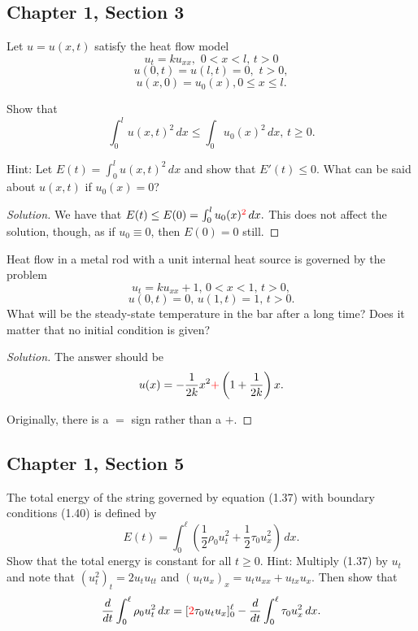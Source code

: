 \documentclass[11pt]{article}
\newenvironment{solution}
  {\renewcommand\qedsymbol{$\blacksquare$}\begin{proof}[Solution]}
  {\end{proof}}
\begin{document}
\subsection{Chapter 1, Section 3}
\begin{exercise}{2}
  Let $u = u(x, t)$ satisfy the heat flow model 
  \[ u_t =ku_{xx}, \, \, 0<x<l, \, t>0 \]
  \[ u(0,t) = u(l,t) = 0, \, \, t > 0,\]
  \[ u(x,0)=u_0(x), 0 \leq x \leq l.\] 
  
  Show that
  \[ \int_0^l u(x, t)^2 \, dx \leq \int_0 u_0(x)^2 \, dx, \, t \geq 0. \]
  
  Hint: Let $E(t) = \int_0^l u(x, t)^2 \, dx$ and show that $E'(t) \leq 0$. What can be said about $u(x, t)$ if $u_0(x) = 0$?
\end{exercise}

\begin{solution}
We have that $E(t) \leq E(0) = \int_0^l u_0(x)^{\textcolor{red}{2}} \, dx.$ This does not affect the solution, though, as if $u_0 \equiv 0$, then $E(0) = 0$ still.

\end{solution}

\begin{exercise}{6}
Heat flow in a metal rod with a unit internal heat source is governed by the problem
\[u_t=ku_{xx}+1, \, 0<x<1, \, t>0, \]
\[u(0,t)=0, \, u(1,t)=1, \, t>0. \]
What will be the steady-state temperature in the bar after a long time? Does it matter that no initial condition is given?
\end{exercise}

\begin{solution}
  The answer should be \[u(x) = -\frac{1}{2k}x^2 \textcolor{red}{+} \left(1+\frac{1}{2k}\right) x.\]

  Originally, there is a $=$ sign rather than a $+$.
\end{solution}

\setcounter{subsection}{4}
\subsection{Chapter 1, Section 5}

\begin{exercise}{5}The total energy of the string governed by equation (1.37) with boundary conditions (1.40) is defined by \[E(t) = \int_{0}^{\ell} \left( \frac{1}{2} \rho_0 u_t^2 + \frac{1}{2} \tau_0 u_x^2 \right) \, dx.\]
Show that the total energy is constant for all $ t \geq 0$. Hint: Multiply (1.37) by $u_t$ and note that $(u_t^2)_t = 2u_tu_{tt}$ and $(u_tu_x)_x = u_tu_{xx} + u_{tx}u_x.$ Then
show that \[\frac{d}{dt} \int_{0}^{\ell} \rho_0 u_t^2 \, dx= [\textcolor{red}{2}\tau_0u_tu_x]_0^\ell - \frac{d}{dt}  \int_{0}^{\ell} \tau_0 u_x^2 \, dx.\]
\end{exercise}
\end{document}
